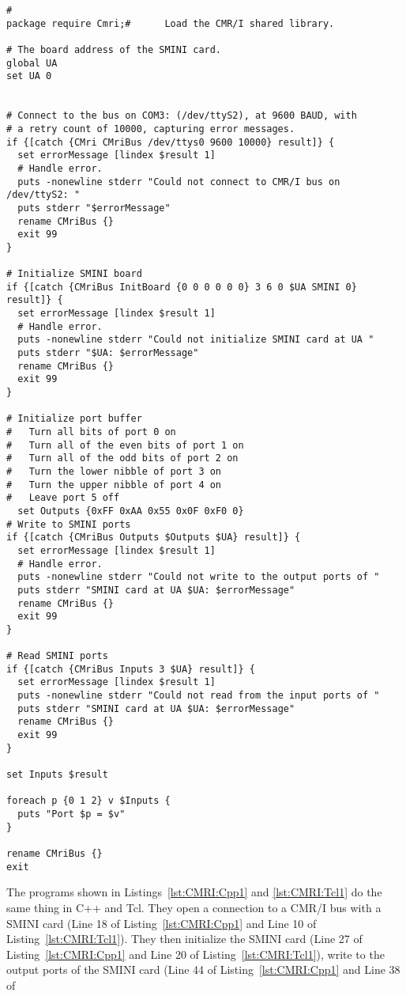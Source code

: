 \begin{lstlisting}[caption={Using the CMR/I from Tcl},
		   label=lst:CMRI:Tcl1]
#
package require Cmri;#		Load the CMR/I shared library.

# The board address of the SMINI card.
global UA
set UA 0


# Connect to the bus on COM3: (/dev/ttyS2), at 9600 BAUD, with
# a retry count of 10000, capturing error messages.
if {[catch {CMri CMriBus /dev/ttys0 9600 10000} result]} {
  set errorMessage [lindex $result 1]
  # Handle error.
  puts -nonewline stderr "Could not connect to CMR/I bus on /dev/ttyS2: "
  puts stderr "$errorMessage"
  rename CMriBus {}
  exit 99
}

# Initialize SMINI board
if {[catch {CMriBus InitBoard {0 0 0 0 0 0} 3 6 0 $UA SMINI 0} result]} {
  set errorMessage [lindex $result 1]
  # Handle error.
  puts -nonewline stderr "Could not initialize SMINI card at UA "
  puts stderr "$UA: $errorMessage"
  rename CMriBus {}
  exit 99
}

# Initialize port buffer
#	Turn all bits of port 0 on 
#	Turn all of the even bits of port 1 on
#	Turn all of the odd bits of port 2 on
#	Turn the lower nibble of port 3 on
#	Turn the upper nibble of port 4 on
#	Leave port 5 off
  set Outputs {0xFF 0xAA 0x55 0x0F 0xF0 0}
# Write to SMINI ports
if {[catch {CMriBus Outputs $Outputs $UA} result]} {
  set errorMessage [lindex $result 1]
  # Handle error.
  puts -nonewline stderr "Could not write to the output ports of "
  puts stderr "SMINI card at UA $UA: $errorMessage"
  rename CMriBus {}
  exit 99
}

# Read SMINI ports
if {[catch {CMriBus Inputs 3 $UA} result]} {
  set errorMessage [lindex $result 1]
  puts -nonewline stderr "Could not read from the input ports of "
  puts stderr "SMINI card at UA $UA: $errorMessage"
  rename CMriBus {}
  exit 99
}

set Inputs $result

foreach p {0 1 2} v $Inputs {
  puts "Port $p = $v"
}

rename CMriBus {} 
exit 
\end{lstlisting} 
The programs shown in Listings~\ref{lst:CMRI:Cpp1} and
\ref{lst:CMRI:Tcl1} do the same thing in C++ and Tcl.  They open a
connection to a CMR/I bus with a SMINI card (Line 18 of
Listing~\ref{lst:CMRI:Cpp1} and Line 10 of
Listing~\ref{lst:CMRI:Tcl1}). They then initialize the SMINI card (Line
27 of Listing~\ref{lst:CMRI:Cpp1} and Line 20 of
Listing~\ref{lst:CMRI:Tcl1}), write to the output ports of the SMINI
card (Line 44 of Listing~\ref{lst:CMRI:Cpp1} and Line 38 of
